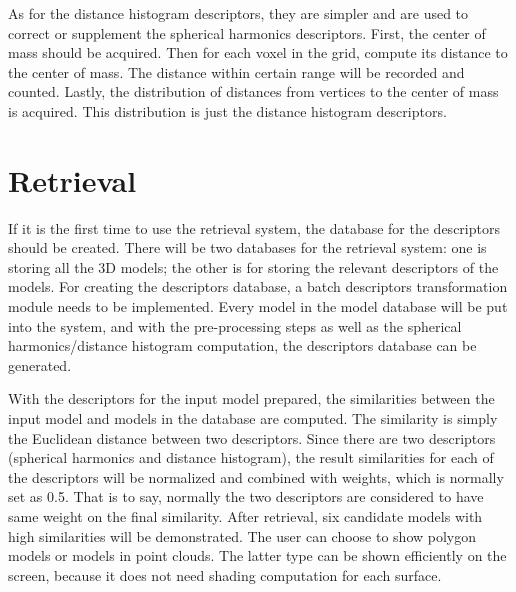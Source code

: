 As for the distance histogram descriptors, they are simpler and are used to correct or supplement the spherical harmonics descriptors. First, the center of mass should be acquired. Then for each voxel in the grid, compute its distance to the center of mass. The distance within certain range will be recorded and counted. Lastly, the 
distribution of distances from vertices to the center of mass is acquired. This distribution is just the distance histogram descriptors.  

\section{Retrieval}

If it is the first time to use the retrieval system, the database for the descriptors should be created. There will be two databases for the retrieval system: one is storing all the 3D models; the other is for storing the relevant descriptors of the models. For creating the descriptors database, a batch descriptors transformation module needs to be implemented. Every model in the model database will be put into the system, and with the pre-processing steps as well as the spherical harmonics/distance histogram computation, the descriptors database can be generated.

With the descriptors for the input model prepared, the similarities between the input model and models in the database are computed. The similarity is simply the Euclidean distance between two descriptors. Since there are two descriptors (spherical harmonics and distance histogram), the result similarities for each of the descriptors will be normalized and combined with weights, which is normally set as 0.5. That is to say, normally the two descriptors are considered to have same weight on the final similarity. After retrieval, six candidate models with high similarities will be demonstrated.  The user can choose to show polygon models or models in point clouds. The latter type can be shown efficiently on the screen, because it does not need shading computation for each surface.  



